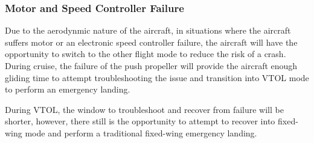 \subsubsection{Motor and Speed Controller Failure}

Due to the aerodynmic nature of the aircraft, in situations where the aircraft
suffers motor or an electronic speed controller failure, the aircraft will have
the opportunity to switch to the other flight mode to reduce the risk of a
crash. During cruise, the failure of the push propeller will provide the
aircraft enough gliding time to attempt troubleshooting the issue and
transition into VTOL mode to perform an emergency landing.

During VTOL, the window to troubleshoot and recover from failure will be
shorter, however, there still is the opportunity to attempt to recover into
fixed-wing mode and perform a traditional fixed-wing emergency landing.
